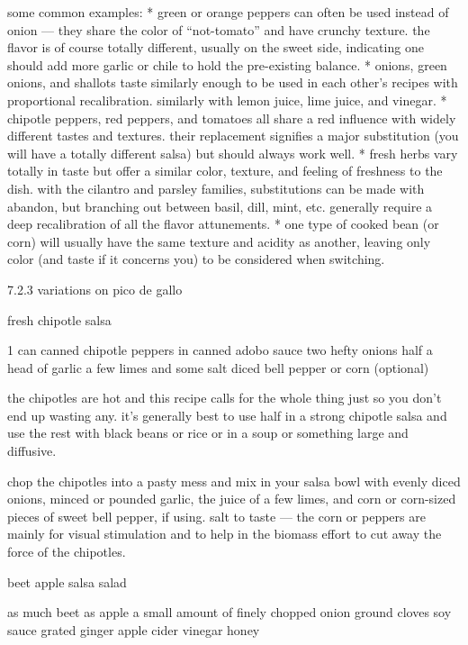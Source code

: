 some common examples:
	* green or orange peppers can often be used instead of onion --- they share the color of ``not-tomato'' and have crunchy texture. the flavor is of course totally different, usually on the sweet side, indicating one should add more garlic or chile to hold the pre-existing balance.
	* onions, green onions, and shallots taste similarly enough to be used in each other's recipes with proportional recalibration. similarly with lemon juice, lime juice, and vinegar.
	* chipotle peppers, red peppers, and tomatoes all share a red influence with widely different tastes and textures. their replacement signifies a major substitution (you will have a totally different salsa) but should always work well.
	* fresh herbs vary totally in taste but offer a similar color, texture, and feeling of freshness to the dish. with the cilantro and parsley families, substitutions can be made with abandon, but branching out between basil, dill, mint, etc. generally require a deep recalibration of all the flavor attunements.
	* one type of cooked bean (or corn) will usually have the same texture and acidity as another, leaving only color (and taste if it concerns you) to be considered when switching.

7.2.3  variations on pico de gallo

fresh chipotle salsa

1 can canned chipotle peppers in canned adobo sauce
two hefty onions
half a head of garlic
a few limes and some salt
diced bell pepper or corn (optional)

the chipotles are hot and this recipe calls for the whole thing just so you don't end up wasting any. it's generally best to use half in a strong chipotle salsa and use the rest with black beans or rice or in a soup or something large and diffusive.

chop the chipotles into a pasty mess and mix in your salsa bowl with evenly diced onions, minced or pounded garlic, the juice of a few limes, and corn or corn-sized pieces of sweet bell pepper, if using. salt to taste --- the corn or peppers are mainly for visual stimulation and to help in the biomass effort to cut away the force of the chipotles.

beet apple salsa salad

as much beet as apple
a small amount of finely chopped onion
ground cloves
soy sauce
grated ginger
apple cider vinegar
honey

